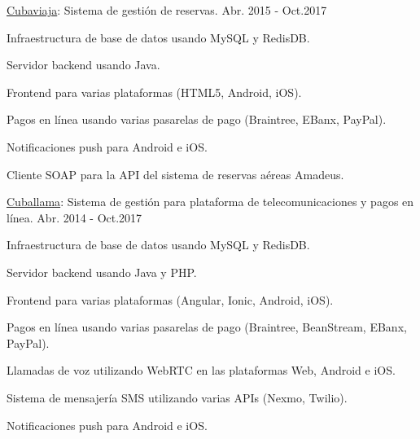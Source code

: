 \begin{cventries}
  \cventry
    {\href{https://www.cuballama.com/viajes/vuelos}{Cubaviaja}: Sistema de gestión de reservas.} %
    {} %
    {} %
    {Abr. 2015 - Oct.2017} %
    {
      \begin{cvitems} %
        \item {Infraestructura de base de datos usando MySQL y RedisDB.}
        \item {Servidor backend usando Java.}
        \item {Frontend para varias plataformas (HTML5, Android, iOS).}
        \item {Pagos en línea usando varias pasarelas de pago (Braintree, EBanx, PayPal).}
        \item {Notificaciones push para Android e iOS.}
        \item {Cliente SOAP para la API del sistema de reservas aéreas Amadeus.}
      \end{cvitems}
    }

  \cventry
    {\href{https://www.cuballama.com/}{Cuballama}: Sistema de gestión para plataforma de telecomunicaciones y pagos en línea.} %
    {} %
    {} %
    {Abr. 2014 - Oct.2017} %
    {
      \begin{cvitems} %
        \item {Infraestructura de base de datos usando MySQL y RedisDB.}
        \item {Servidor backend usando Java y PHP.}
        \item {Frontend para varias plataformas (Angular, Ionic, Android, iOS).}
        \item {Pagos en línea usando varias pasarelas de pago (Braintree, BeanStream, EBanx, PayPal).}
        \item {Llamadas de voz utilizando WebRTC en las plataformas Web, Android e iOS.}
        \item {Sistema de mensajería SMS utilizando varias APIs (Nexmo, Twilio).}
        \item {Notificaciones push para Android e iOS.}
      \end{cvitems}
    }

\end{cventries}
